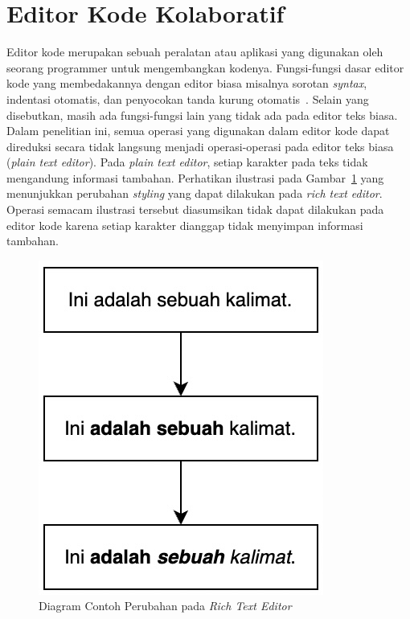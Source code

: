 \section{Editor Kode Kolaboratif}

Editor kode merupakan sebuah peralatan atau aplikasi yang digunakan oleh seorang programmer untuk mengembangkan kodenya. Fungsi-fungsi dasar editor kode yang membedakannya dengan editor biasa misalnya sorotan \textit{syntax}, indentasi otomatis, dan penyocokan tanda kurung otomatis~\citep{kinder2013sublime, intellij2011most}. Selain yang disebutkan, masih ada fungsi-fungsi lain yang tidak ada pada editor teks biasa. Dalam penelitian ini, semua operasi yang digunakan dalam editor kode dapat direduksi secara tidak langsung menjadi operasi-operasi pada editor teks biasa (\textit{plain text editor}). Pada \textit{plain text editor}, setiap karakter pada teks tidak mengandung informasi tambahan. Perhatikan ilustrasi pada Gambar~\ref{fig:2:richtext} yang menunjukkan perubahan \textit{styling} yang dapat dilakukan pada \textit{rich text editor}. Operasi semacam ilustrasi tersebut diasumsikan tidak dapat dilakukan pada editor kode karena setiap karakter dianggap tidak menyimpan informasi tambahan.

\begin{figure}
    \centering
    \includegraphics[scale=0.8]{assets/skripsi/richtext}
    \caption{Diagram Contoh Perubahan pada \textit{Rich Text Editor}}
    \label{fig:2:richtext}
\end{figure}

